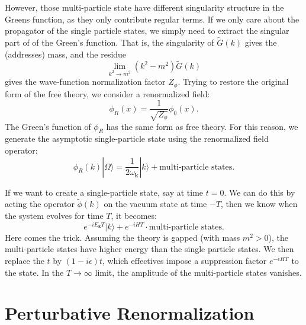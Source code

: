 \documentclass[aps,prb,superscriptaddress,nofootinbib]{revtex4}
\begin{document}
However, those multi-particle state have different singularity structure in the Greens function, as they only contribute regular terms.
If we only care about the propagator of the single particle states, we simply need to extract the singular part of of the Green's function.
That is, the singularity of $\tilde{G}(k)$ gives the (addresses) mass, and the residue 
\begin{equation*}
	\lim_{k^2 \rightarrow m^2} (k^2-m^2)\tilde{G}(k)
\end{equation*}
gives the wave-function normalization factor $Z_\phi$.
Trying to restore the original form of the free theory, we consider a renormalized field:
\begin{equation}
	\phi_R(x) = \frac{1}{\sqrt{Z_\phi}}\phi_0(x).
\end{equation}
The Green's function of $\phi_R$ has the same form as free theory.
For this reason, we generate the asymptotic single-particle state using the renormalized field operator:
\begin{equation}\label{eq:scalar-field-generate-particle}
	\phi_R(k)|\Omega\rangle = \frac{1}{2\omega_{\bm k}}|k\rangle + \text{multi-particle states}.
\end{equation}

If we want to create a single-particle state, say at time $t=0$.
We can do this by acting the operator $\tilde{\phi}(k)$ on the vacuum state at time $-T$, then we know when the system evolves for time $T$, it becomes:
\begin{equation}
	e^{-i E_{\bm k} T}|k\rangle + e^{-iHT} \cdot \text{multi-particle states}.
\end{equation}
Here comes the trick.
Assuming the theory is gapped (with mass $m^2>0$), the multi-particle states have higher energy than the single particle states.
We then replace the $t$ by $(1-i\epsilon)t$, which effectives impose a suppression factor $e^{-\epsilon H T}$ to the state.
In the $T\rightarrow \infty$ limit, the amplitude of the multi-particle states vanishes.


\section{Perturbative Renormalization}
\end{document}
